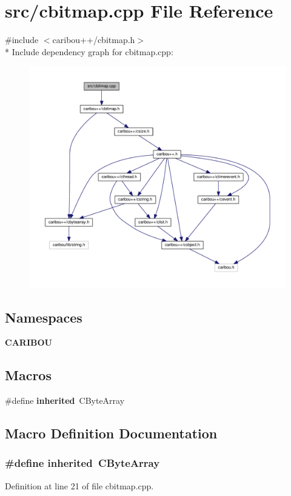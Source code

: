 \section{src/cbitmap.cpp File Reference}
\label{cbitmap_8cpp}
{\ttfamily \#include $<$caribou++/cbitmap.\+h$>$}\\*
Include dependency graph for cbitmap.\+cpp\+:
\nopagebreak
\begin{figure}[H]
\begin{center}
\leavevmode
\includegraphics[width=350pt]{cbitmap_8cpp__incl}
\end{center}
\end{figure}
\subsection*{Namespaces}
\begin{DoxyCompactItemize}
\item 
 {\bf C\+A\+R\+I\+B\+OU}
\end{DoxyCompactItemize}
\subsection*{Macros}
\begin{DoxyCompactItemize}
\item 
\#define {\bf inherited}~C\+Byte\+Array
\end{DoxyCompactItemize}


\subsection{Macro Definition Documentation}
\subsubsection[{inherited}]{\setlength{\rightskip}{0pt plus 5cm}\#define inherited~C\+Byte\+Array}\label{cbitmap_8cpp_a3920e3b7cb0909b941b2409493acf8f1}


Definition at line 21 of file cbitmap.\+cpp.

